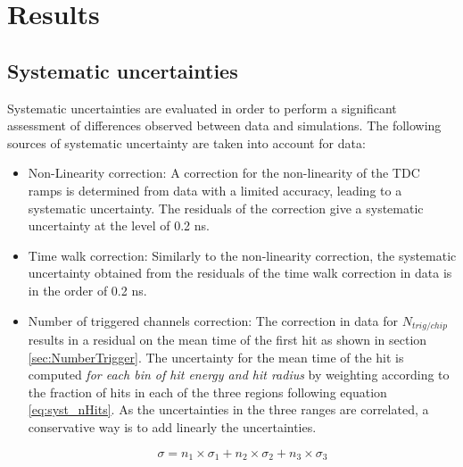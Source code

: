 \documentclass{JINST}
\begin{document}
\section{Results}

\subsection{Systematic uncertainties}
\label{sec:syst_uncert}

Systematic uncertainties are evaluated in order to perform a significant assessment of differences observed between data and simulations. The following sources of systematic uncertainty are taken into account for data:
\begin{itemize}
  \item Non-Linearity correction: A correction for the non-linearity of the TDC ramps is determined from data with a limited accuracy, leading to a systematic uncertainty. The residuals of the correction give a systematic uncertainty at the level of 0.2 ns.
  \item Time walk correction: Similarly to the non-linearity correction, the systematic uncertainty obtained from the residuals of the time walk correction in data is in the order of 0.2 ns.
  \item Number of triggered channels correction: The correction in data for $N_{trig/chip}$ results in a residual on the mean time of the first hit as shown in section \ref{sec:NumberTrigger}. The uncertainty for the mean time of the hit is computed \textit{for each bin of hit energy and hit radius} by weighting according to the fraction of hits in each of the three regions following equation \ref{eq:syst_nHits}. As the uncertainties in the three ranges are correlated, a conservative way is to add linearly the uncertainties.

  \begin{equation}
    \sigma = n_1 \times \sigma_1 + n_2 \times \sigma_2 + n_3 \times \sigma_3 \label{eq:syst_nHits}
  \end{equation}


\end{itemize}
\end{document}
